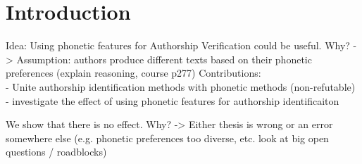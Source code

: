 \chapter{Introduction}\label{introduction}
Idea: Using phonetic features for Authorship Verification could be useful.
Why? -> Assumption: authors produce different texts based on their phonetic preferences (explain reasoning, course p277)
Contributions:\\
- Unite authorship identification methods with phonetic methods (non-refutable)
- investigate the effect of using phonetic features for authorship identificaiton

We show that there is no effect.
Why? -> Either thesis is wrong or an error somewhere else (e.g. phonetic preferences too diverse, etc. look at big open questions / roadblocks)










